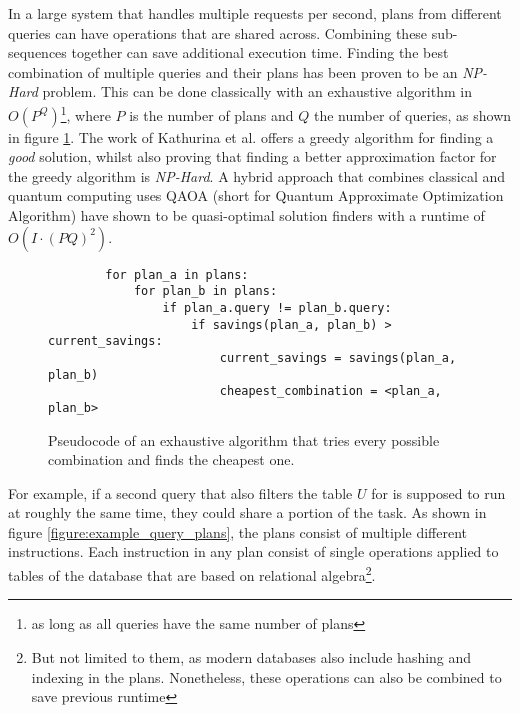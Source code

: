 In a large system that handles multiple requests per second, plans from different queries can have operations that are shared across. Combining these sub-sequences together can save additional execution time\cite{roy_multi-query_2009}. Finding the best combination of multiple queries and their plans has been proven to be an \emph{NP-Hard} problem\cite{sellis_multiple-query_1990}. This can be done classically with an exhaustive algorithm in $O(P^Q)$\footnote{as long as all queries have the same number of plans}, where $P$ is the number of plans and $Q$ the number of queries, as shown in figure \ref{figure:pseudocode_bruteforce_search}. The work of Kathurina et al.\cite{kathuria_provable_mqo} offers a greedy algorithm for finding a \emph{good} solution, whilst also proving that finding a better approximation factor for the greedy algorithm is \emph{NP-Hard}. A hybrid approach that combines classical and quantum computing uses QAOA (short for Quantum Approximate Optimization Algorithm)\cite{farhi_quantum_2014} have shown to be quasi-optimal solution finders with a runtime of $O(I \cdot (PQ)^2)$\cite{fankhauser_multiple_2021}. \par


\begin{figure}[!h]
    \centering
    \begin{verbatim}
        for plan_a in plans:
            for plan_b in plans:
                if plan_a.query != plan_b.query:
                    if savings(plan_a, plan_b) > current_savings:
                        current_savings = savings(plan_a, plan_b)
                        cheapest_combination = <plan_a, plan_b>
    \end{verbatim}
    \caption{Pseudocode of an exhaustive algorithm that tries every possible combination and finds the cheapest one.}
    \label{figure:pseudocode_bruteforce_search}
\end{figure}

 For example, if a second query that also filters the table $U$ for  is supposed to run at roughly the same time, they could share a portion of the task. As shown in figure \ref{figure:example_query_plans}, the plans consist of multiple different instructions. Each instruction in any plan consist of single operations applied to tables of the database that are based on relational algebra\cite{codd_relational_1970}\footnote{But not limited to them, as modern databases also include hashing and indexing in the plans. Nonetheless, these operations can also be combined to save previous runtime}. 
 
